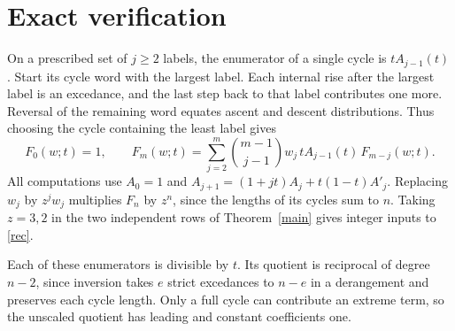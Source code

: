 \documentclass[10pt,a4paper]{article}
\begin{document}
\section{Exact verification}
On a prescribed set of $j\ge2$ labels, the enumerator of a single cycle is $tA_{j-1}(t)$. Start its cycle word with the largest label. Each internal rise after the largest label is an excedance, and the last step back to that label contributes one more. Reversal of the remaining word equates ascent and descent distributions. Thus choosing the cycle containing the least label gives
\begin{equation}\label{rec}
 F_0(w;t)=1,\qquad
 F_m(w;t)=\sum_{j=2}^m \binom{m-1}{j-1}
            w_j\,tA_{j-1}(t)\,F_{m-j}(w;t).
\end{equation}
All computations use $A_0=1$ and $A_{j+1}=(1+jt)A_j+t(1-t)A'_j$. Replacing $w_j$ by $z^j w_j$ multiplies $F_n$ by $z^n$, since the lengths of its cycles sum to $n$. Taking $z=3,2$ in the two independent rows of Theorem~\ref{main} gives integer inputs to \eqref{rec}.

Each of these enumerators is divisible by $t$. Its quotient is reciprocal of degree $n-2$, since inversion takes $e$ strict excedances to $n-e$ in a derangement and preserves each cycle length. Only a full cycle can contribute an extreme term, so the unscaled quotient has leading and constant coefficients one.
\end{document}
